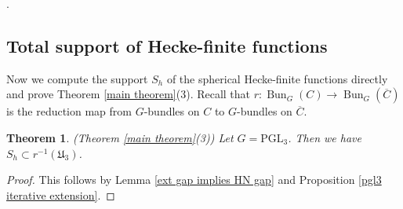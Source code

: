 \documentclass[11pt]{amsart}
\newtheorem{thm}{Theorem}[section]
\theoremstyle{definition}
\theoremstyle{remark}
\DeclareMathOperator{\bun}{Bun}
\newcommand{\PGL}{\mathrm{PGL}}
\numberwithin{equation}{section}
\begin{document}
.

\subsection{Total support of Hecke-finite functions }

Now we compute the support $S_h$ of the spherical Hecke-finite functions directly and prove Theorem \ref{main theorem}(3). Recall that $r: \bun_G(C) \to \bun_G(\overline{C})$ is the reduction map from $G$-bundles on $C$ to $G$-bundles on $\overline{C}$.

\begin{thm}(Theorem \ref{main theorem}(3))
    Let $G=\PGL_3$. Then we have $S_h \subset r^{-1}(\mathfrak{U}_3)$. 
\end{thm}
\begin{proof}
    This follows by Lemma \ref{ext gap implies HN gap} and Proposition \ref{pgl3 iterative extension}.
\end{proof}
\end{document}
